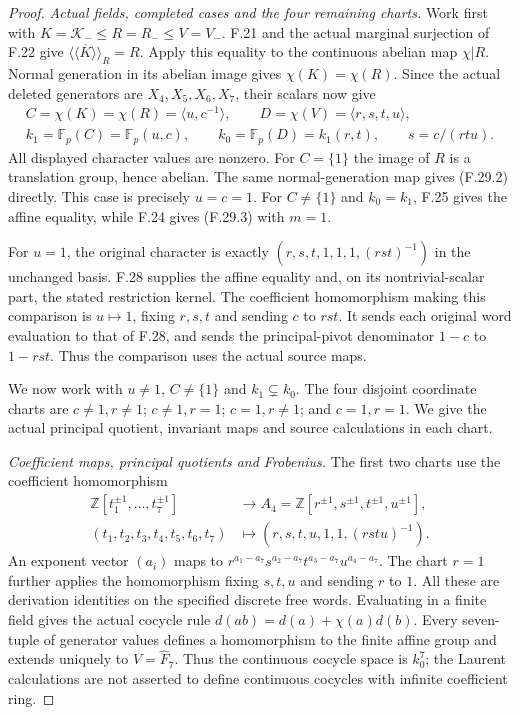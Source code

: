 \begin{proof}
\emph{Actual fields, completed cases and the four remaining charts.}
Work first with $K=\mathcal K_-\leq R=R_-\leq V=V_-$.
F.21 and the actual marginal surjection of F.22
give $\overline{\langle\!\langle K\rangle\!\rangle}_R=R$.
Apply this equality to the continuous abelian
map $\chi|R$. Normal generation in its abelian
image gives $\chi(K)=\chi(R)$.
Since the actual deleted generators are
$X_4,X_5,X_6,X_7$, their scalars now give
\[
 \begin{gathered}
 C=\chi(K)=\chi(R)=\langle u,c^{-1}\rangle,
 \qquad D=\chi(V)=\langle r,s,t,u\rangle,\\
 k_1=\mathbb F_p(C)=\mathbb F_p(u,c),\qquad
 k_0=\mathbb F_p(D)=k_1(r,t),\qquad s=c/(rtu).
 \end{gathered}                                                \tag{F.29.4}
\]
All displayed character values are nonzero.
For $C=\{1\}$ the image of $R$ is a translation
group, hence abelian. The same normal-generation
map gives (F.29.2) directly. This case is precisely
$u=c=1$.
For $C\ne\{1\}$ and $k_0=k_1$, F.25 gives the
affine equality, while F.24 gives (F.29.3) with
$m=1$.

For $u=1$, the original character is exactly
$(r,s,t,1,1,1,(rst)^{-1})$ in the unchanged basis.
F.28 supplies the affine equality and, on its
nontrivial-scalar part, the stated restriction
kernel. The coefficient homomorphism making this
comparison is $u\mapsto1$, fixing $r,s,t$ and
sending $c$ to $rst$. It sends each original
word evaluation to that of F.28, and sends the
principal-pivot denominator $1-c$ to $1-rst$.
Thus the comparison uses the actual source maps.

We now work with $u\ne1$, $C\ne\{1\}$ and
$k_1\subsetneq k_0$. The four disjoint coordinate
charts are $c\ne1,r\ne1$; $c\ne1,r=1$;
$c=1,r\ne1$; and $c=1,r=1$.
We give the actual principal quotient, invariant
maps and source calculations in each chart.

\emph{Coefficient maps, principal quotients and Frobenius.}
The first two charts use the coefficient homomorphism
\[
 \begin{aligned}
 \mathbb Z[t_1^{\pm1},\ldots,t_7^{\pm1}]&\longrightarrow
     A_4=\mathbb Z[r^{\pm1},s^{\pm1},t^{\pm1},u^{\pm1}],\\
 (t_1,t_2,t_3,t_4,t_5,t_6,t_7)&\longmapsto
                  (r,s,t,u,1,1,(rstu)^{-1}).
 \end{aligned}                                                \tag{F.29.5}
\]
An exponent vector $(a_i)$ maps to
$r^{a_1-a_7}s^{a_2-a_7}t^{a_3-a_7}u^{a_4-a_7}$.
The chart $r=1$ further applies the homomorphism
fixing $s,t,u$ and sending $r$ to $1$.
All these are derivation identities on the
specified discrete free words. Evaluating in
a finite field gives the actual cocycle rule
$d(ab)=d(a)+\chi(a)d(b)$.
Every seven-tuple of generator values defines
a homomorphism to the finite affine group and
extends uniquely to $V=\widehat F_7$.
Thus the continuous cocycle space is $k_0^7$;
the Laurent calculations are not asserted to
define continuous cocycles with infinite coefficient ring.


\end{proof}
